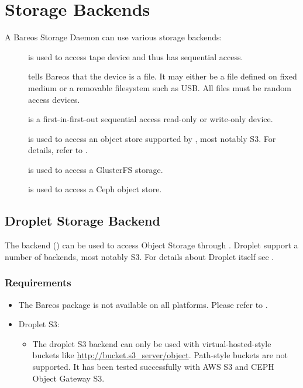 \chapter{Storage Backends}

A Bareos Storage Daemon can use various storage backends:

\begin{description}
\item [] is used to access tape device and thus has sequential access.
\item []
  tells Bareos that the device is a file. It may either be a
  file defined on fixed medium or a removable filesystem such as
  USB.  All files must be random access devices.
\item [] is a first-in-first-out sequential access read-only
  or write-only device.
\item [] is used to access an object store supported by , most notably S3.
  For details, refer to .
\item [] is used to access a GlusterFS storage.
\item [] is used to access a Ceph object store.
\end{description}



\section{Droplet Storage Backend}
\label{SdBackendDroplet}

The  backend () can be used to access Object Storage through .
Droplet support a number of backends, most notably S3.
For details about Droplet itself see \externalReferenceDroplet.

\subsection{Requirements}

\begin{itemize}
  \item The Bareos package  is not available on all platforms. Please refer to .
  \item Droplet S3:
  \begin{itemize}
    \item The droplet S3 backend can only be used with virtual-hosted-style buckets like \url{http://bucket.s3_server/object}.
        Path-style buckets are not supported.
        It has  been tested successfully with AWS S3 and CEPH Object Gateway S3.
  \end{itemize}
\end{itemize}


